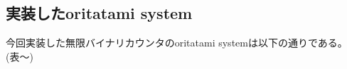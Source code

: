 \documentclass[a4,11pt]{article}
\begin{document}
\subsection{実装したoritatami system}
今回実装した無限バイナリカウンタのoritatami systemは以下の通りである。\\
(表〜)\\
\end{document}
